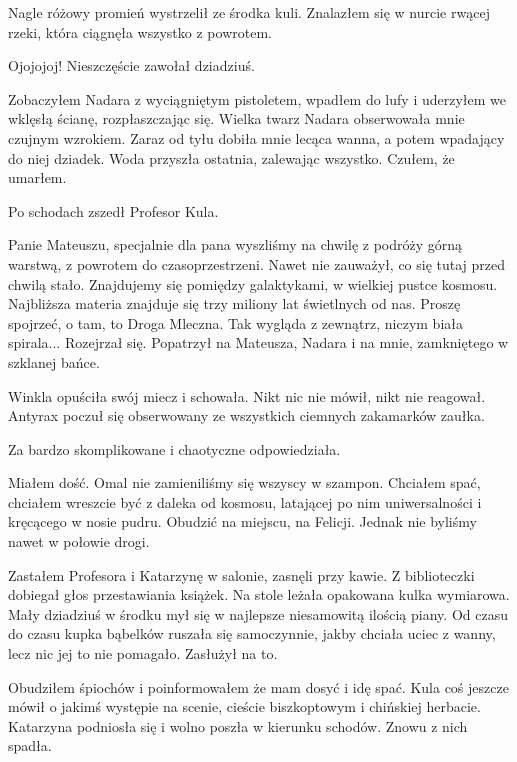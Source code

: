 Nagle różowy promień wystrzelił ze środka kuli.
Znalazłem się w nurcie rwącej rzeki, która ciągnęła wszystko z powrotem.
\begin{dialogue}
\ds{} Ojojojoj! Nieszczęście \dm{} zawołał dziadziuś.
\end{dialogue}
Zobaczyłem Nadara z wyciągniętym pistoletem, wpadłem do lufy i uderzyłem we wklęsłą ścianę, rozpłaszczając się.
Wielka twarz Nadara obserwowała mnie czujnym wzrokiem.
Zaraz od tyłu dobiła mnie lecąca wanna, a potem wpadający do niej dziadek.
Woda przyszła ostatnia, zalewając wszystko.
Czułem, że umarłem.

Po schodach zszedł Profesor Kula.
\begin{dialogue}
\ds{} Panie Mateuszu, specjalnie dla pana wyszliśmy na chwilę z podróży górną warstwą, z powrotem do czasoprzestrzeni. \dm{} Nawet nie zauważył, co się tutaj przed chwilą stało.
\dm{} Znajdujemy się pomiędzy galaktykami,  w wielkiej pustce kosmosu. Najbliższa materia znajduje się trzy miliony lat świetlnych od nas. Proszę spojrzeć, 
o tam, to Droga Mleczna. Tak wygląda z zewnątrz, niczym biała spirala... \dm{} Rozejrzał się. Popatrzył na Mateusza, Nadara i na mnie, zamkniętego w szklanej bańce.
\end{dialogue}

\divider{}

Winkla opuściła swój miecz i schowała. 
Nikt nic nie mówił, nikt nie reagował. 
Antyrax poczuł się obserwowany ze wszystkich ciemnych zakamarków zaułka.
\begin{dialogue}
\ds{} Za bardzo skomplikowane i chaotyczne \dm{} odpowiedziała.
\end{dialogue}

\divider{}

Miałem dość. Omal nie zamieniliśmy się wszyscy w szampon.
Chciałem spać, chciałem wreszcie być z daleka od kosmosu, latającej po nim uniwersalności i kręcącego w nosie pudru.
Obudzić na miejscu, na Felicji.
Jednak nie byliśmy nawet w połowie drogi.

Zastałem Profesora i Katarzynę w salonie, zasnęli przy kawie.
Z biblioteczki dobiegał głos przestawiania książek.
Na stole leżała opakowana kulka wymiarowa. Mały dziadziuś w środku mył się w najlepsze niesamowitą ilością piany.
Od czasu do czasu kupka bąbelków ruszała się samoczynnie, jakby chciała uciec z wanny, lecz nic jej to nie pomagało.
Zasłużył na to.

Obudziłem śpiochów i poinformowałem że mam dosyć i idę spać.
Kula coś jeszcze mówił o jakimś występie na scenie, cieście biszkoptowym i chińskiej herbacie. 
Katarzyna podniosła się i wolno poszła w kierunku schodów.
Znowu z nich spadła.

